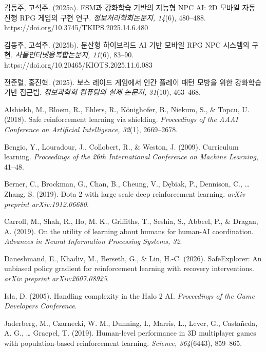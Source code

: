 \documentclass[12pt]{article}      %
\newenvironment{apareferences}
  {\begin{list}{}{%
      \setlength{\leftmargin}{0.5in}%
      \setlength{\itemindent}{-0.5in}%
      \setlength{\listparindent}{-0.5in}%
      \setlength{\itemsep}{0pt}%
      \setlength{\parsep}{0pt}}%
   \raggedright}
  {\end{list}}
\newcommand{\refitem}{\item}
\begin{document}
\begin{apareferences}


\refitem 김동주, 고석주. (2025a). FSM과 강화학습 기반의 지능형 NPC AI: 2D 모바일
자동 진행 RPG 게임의 구현 연구. \emph{정보처리학회논문지, 14}(6), 480--488.
https://doi.org/10.3745/TKIPS.2025.14.6.480

\refitem 김동주, 고석주. (2025b). 분산형 하이브리드 AI 기반 모바일 RPG NPC
시스템의 구현. \emph{사물인터넷융복합논문지, 11}(6), 83--90.
https://doi.org/10.20465/KIOTS.2025.11.6.083

\refitem 전준렬, 홍진혁. (2025). 보스 레이드 게임에서 인간 플레이 패턴 모방을
위한 강화학습 기반 접근법. \emph{정보과학회 컴퓨팅의 실제 논문지, 31}(10),
463--468.


\refitem Alshiekh, M., Bloem, R., Ehlers, R., K\"onighofer, B., Niekum, S., \&
Topcu, U. (2018). Safe reinforcement learning via shielding. \emph{Proceedings
of the AAAI Conference on Artificial Intelligence, 32}(1), 2669--2678.

\refitem Bengio, Y., Louradour, J., Collobert, R., \& Weston, J. (2009).
Curriculum learning. \emph{Proceedings of the 26th International Conference on
Machine Learning}, 41--48.

\refitem Berner, C., Brockman, G., Chan, B., Cheung, V., D\k{e}biak, P.,
Dennison, C., \ldots{} Zhang, S. (2019). Dota 2 with large scale deep
reinforcement learning. \emph{arXiv preprint arXiv:1912.06680}.

\refitem Carroll, M., Shah, R., Ho, M. K., Griffiths, T., Seshia, S., Abbeel,
P., \& Dragan, A. (2019). On the utility of learning about humans for
human-AI coordination. \emph{Advances in Neural Information Processing
Systems, 32}.

\refitem Daneshmand, E., Khadiv, M., Berseth, G., \& Lin, H.-C. (2026).
SafeExplorer: An unbiased policy gradient for reinforcement learning with
recovery interventions. \emph{arXiv preprint arXiv:2607.08925}.

\refitem Isla, D. (2005). Handling complexity in the Halo 2 AI.
\emph{Proceedings of the Game Developers Conference}.

\refitem Jaderberg, M., Czarnecki, W. M., Dunning, I., Marris, L., Lever, G.,
Casta\~neda, A. G., \ldots{} Graepel, T. (2019). Human-level performance in
3D multiplayer games with population-based reinforcement learning.
\emph{Science, 364}(6443), 859--865.


\end{apareferences}
\end{document}
